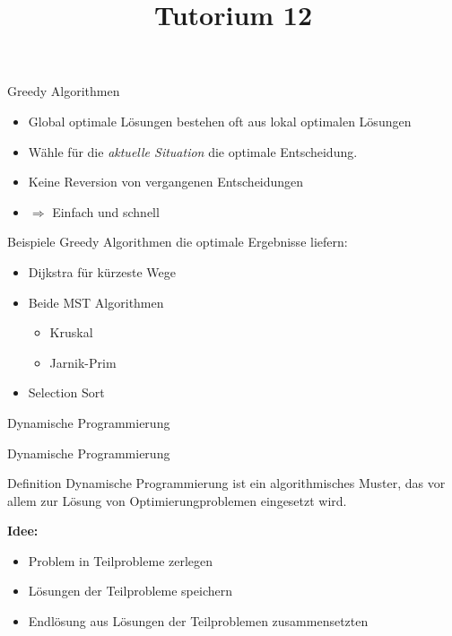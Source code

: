 
\title[Algorithmen I SS 14]{Tutorium 12}

\usepackage{alltt}




\begin{frame}
  \maketitle
\end{frame}

\begin{frame}{Greedy Algorithmen}
	\begin{itemize}
		\item Global optimale Lösungen bestehen oft aus lokal optimalen Lösungen
		\item Wähle für die \emph{aktuelle Situation} die optimale Entscheidung.
		\item Keine Reversion von vergangenen Entscheidungen
		\item $\Rightarrow$ Einfach und schnell
	\end{itemize}
\end{frame}

\begin{frame}{Beispiele}
	\large{Greedy Algorithmen die optimale Ergebnisse liefern:}
	\begin{itemize}
		\item Dijkstra für kürzeste Wege
		\item Beide MST Algorithmen
		\begin{itemize}
			\item Kruskal
			\item Jarnik-Prim
		\end{itemize}
		\item Selection Sort
	\end{itemize}

\end{frame}

\begin{frame}
	\begin{center}
		\Huge
		Dynamische Programmierung
	\end{center}
\end{frame}

\begin{frame}{Dynamische Programmierung}
	\begin{block}{Definition}
		Dynamische Programmierung ist ein algorithmisches Muster, das vor allem zur Lösung von Optimierungproblemen eingesetzt wird.
	\end{block}
	\textbf{Idee:}
	\begin{itemize}
		\item Problem in Teilprobleme zerlegen
		\item Lösungen der Teilprobleme speichern
		\item Endlösung aus Lösungen der Teilproblemen zusammensetzten
	\end{itemize}
\end{frame}

